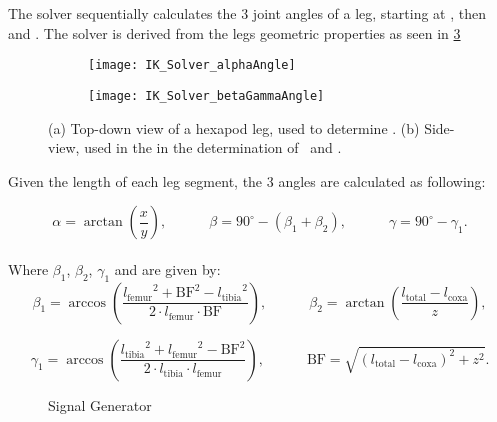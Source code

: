 The solver sequentially calculates the 3 joint angles of a leg, starting at \textalpha, then \textbeta and \textgamma.
The solver is derived from the legs geometric properties as seen in \ref{figure: IK angle derivations}

\begin{figure}[h]
	\begin{subfigure}{.5\textwidth} %
		\centering
		\texttt{[image: IK\_Solver\_alphaAngle]}  %
		\caption{}
		\label{figure: IK Solver Alpha Angle}
	\end{subfigure}
	\begin{subfigure}{.5\textwidth}
		\centering
		\texttt{[image: IK\_Solver\_betaGammaAngle]}  
		\caption{}
		\label{figure: IK Solver Beta/Gamma Angle}
	\end{subfigure}
	\caption[Angle derivation drawings]{(a) Top-down view of a hexapod leg, used to determine \textalpha. (b) Side-view, used in the in the determination of \textbeta \ and \textgamma.}
	\label{figure: IK angle derivations}
\end{figure}


 Given the length of each leg segment, the 3 angles are calculated as following:

\[
	\alpha = \arctan(\frac{x}{y}) ,\quad \quad \quad \beta = 90^{\circ} - (\beta_1 + \beta_2) ,\quad \quad \quad \gamma = 90^{\circ} - \gamma_1.
\]
\\
Where $\beta_1$, $\beta_2$, $\gamma_1$ and  are given by:
\[	
	\beta_1 = \arccos(\frac{{l_\text{femur}}^2 + \text{BF}^2 - {l_\text{tibia}}^2}  {2\cdot l_\text{femur} \cdot \text{BF}}) ,\quad \quad \quad \beta_2 = \arctan(\frac{ l_\text{total} - l_\text{coxa}} {z}),
\]

\[
	\gamma_1 = \arccos(\frac{{l_\text{tibia}}^2 + {l_\text{femur}}^2 - {\text{BF}}^2}  {2 \cdot {l_\text{tibia}} \cdot {l_\text{femur}}}) ,\quad \quad \quad \text{BF} = \sqrt{(l_\text{total} - l_\text{coxa})^2 + z^2}.
\]








\begin{figure}[h]
	\centerline{}
	\caption{Signal Generator}
	\label{figure: Signal Generator}
\end{figure}

